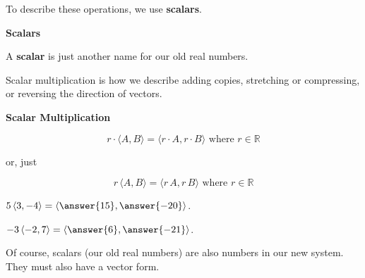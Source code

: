 \documentclass{ximera}
\begin{document}
To describe these operations, we use \textbf{scalars}.


\begin{definition}  \textbf{\textcolor{green!50!black}{Scalars}}  

A \textbf{scalar} is just another name for our old real numbers.

\end{definition}


Scalar multiplication is how we describe adding copies, stretching or compressing, or reversing the direction of vectors.


\begin{definition}  \textbf{\textcolor{green!50!black}{Scalar Multiplication}}  

\[    r \cdot \langle A, B \rangle  = \langle r \cdot A, r \cdot B \rangle   \text{ where }  r \in \mathbb{R}   \]

or, just

\[    r \, \langle A, B \rangle  = \langle r \, A, r \, B \rangle   \text{ where }  r \in \mathbb{R}   \]

\end{definition}









\begin{question} 


$5 \, \langle 3, -4 \rangle  = \left\langle \answer{15}, \answer{-20} \right\rangle$.



\end{question}









\begin{question} 


$-3 \, \langle -2, 7 \rangle  = \left\langle \answer{6}, \answer{-21} \right\rangle$.



\end{question}







Of course, scalars (our old real numbers) are also numbers in our new system.  They must also have a vector form. 
\end{document}
